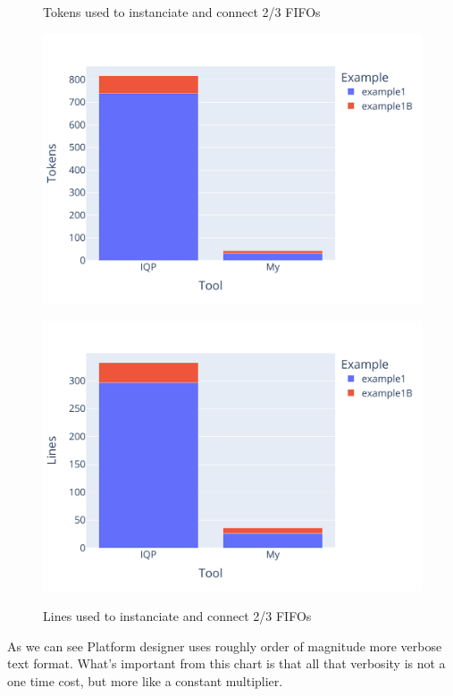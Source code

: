 \documentclass[12pt]{report}
\begin{document}
\begin{figure}[H]
\begin{minipage}{.45\textwidth}
    \caption{Tokens used to instanciate and connect 2/3 FIFOs}
    \includegraphics[width=\textwidth]{charts/example1_tokens.pdf}
    \label{fig:sub1}
    \centering
\end{minipage}%
\hspace{0.5cm}
\begin{minipage}{.45\textwidth}
    \caption{Lines used to instanciate and connect 2/3 FIFOs}
    \includegraphics[width=\textwidth]{charts/example1_lines.pdf}
    \label{fig:sub2}
    \centering
\end{minipage}
\end{figure}
As we can see Platform designer uses roughly order of magnitude more verbose text format. What's important from this chart is that all that verbosity is not a one time cost, but more like a constant multiplier. 
\end{document}
